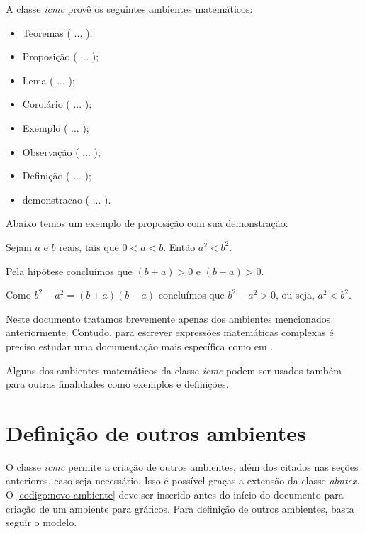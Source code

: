 A classe \textit{icmc} provê os seguintes ambientes matemáticos:
\begin{itemize}
 \item Teoremas ( ... );
 \item Proposição ( ... );
 \item Lema ( ... );
 \item Corolário ( ... );
 \item Exemplo ( ... );
 \item Observação ( ... );
 \item Definição ( ... );
 \item demonstracao ( ... ).
\end{itemize}

Abaixo temos um exemplo de proposição com sua demonstração:
\begin{proposicao}
 Sejam $a$ e $b$ reais, tais que $0<a<b$. Então $a^2<b^2$.
\end{proposicao}
\begin{demonstracao}
 Pela hipótese concluímos que $(b+a)>0$ e $(b-a)>0$.

Como $b^2-a^2=(b+a)(b-a)$ concluímos que $b^2-a^2>0$, ou seja, $a^2<b^2$.
\end{demonstracao}

Neste documento tratamos brevemente apenas dos ambientes mencionados anteriormente. Contudo, para escrever expressões matemáticas complexas é preciso estudar uma documentação mais específica como em .

Alguns dos ambientes matemáticos da classe \textit{icmc} podem ser usados também para outras finalidades como exemplos e definições.


\section{Definição de outros ambientes}
\label{secao:outros-ambientes}

O classe \textit{icmc} permite a criação de outros ambientes, além dos citados nas seções anteriores, caso seja necessário. Isso é possível graças a extensão da classe \textit{abntex}. O \autoref{codigo:novo-ambiente} deve ser inserido antes do início do documento para criação de um ambiente para gráficos. Para definição de outros ambientes, basta seguir o modelo.


